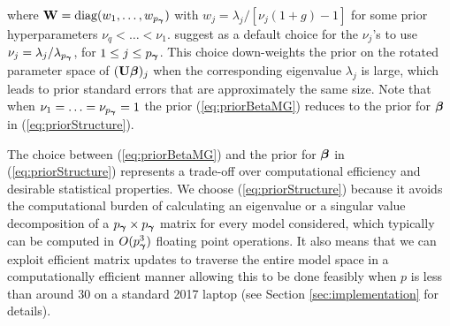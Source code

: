 \noindent where ${\bf W} = \mbox{diag}(w_1,\ldots,w_{p_{{\boldsymbol \gamma}}})$ with $ w_j = \lambda_j/[\nu_j(1 + g) - 1]$ for 
some prior hyperparameters $\nu_q < \ldots < \nu_1$. \cite{Maruyama2011} suggest as a default 
choice for the $\nu_j$'s to use $\nu_j = \lambda_j/\lambda_{p_{{\boldsymbol \gamma}}}$, for $1\le j \le p_{{\boldsymbol \gamma}}$. 
This choice down-weights the prior on the rotated parameter space of $({\bf U} {\boldsymbol \beta})_j$ when the 
corresponding eigenvalue $\lambda_j$ is large, which leads to prior standard errors that are 
approximately the same size. Note that when $\nu_1 = \ldots = \nu_{p_{{\boldsymbol \gamma}}} = 1$ the prior 
(\ref{eq:priorBetaMG}) reduces to the prior for ${\boldsymbol \beta}$ in (\ref{eq:priorStructure}). 

The choice between (\ref{eq:priorBetaMG}) and the prior for ${\boldsymbol \beta}$ in (\ref{eq:priorStructure}) 
represents a trade-off over computational efficiency and desirable statistical properties. We choose
(\ref{eq:priorStructure}) because it avoids the computational burden of calculating an eigenvalue or a singular 
value decomposition of a $p_{{\boldsymbol \gamma}}\times p_{{\boldsymbol \gamma}}$ matrix for every model considered,
which typically can be computed in $O(p_{{\boldsymbol \gamma}}^3)$ floating point operations.
It also means that we can 
exploit efficient matrix updates to traverse the entire model space in a computationally efficient 
manner allowing this to be done feasibly when $p$ is less than around 30 on a standard 2017 laptop 
(see Section \ref{sec:implementation} for details).


